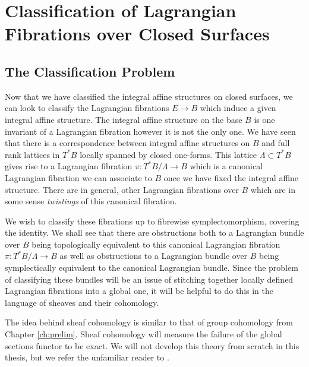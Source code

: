 \chapter{Classification of Lagrangian Fibrations over Closed Surfaces}\label{ch:classify-fibr}
\section{The Classification Problem}

Now that we have classified the integral affine structures on closed surfaces,
we can look to classify the Lagrangian fibrations $E \to B$ which induce a
given integral affine structure. The integral affine structure on the base $B$
is one invariant of a Lagrangian fibration however it is not the only one. We
have seen that there is a correspondence between integral affine structures on
$B$ and full rank lattices in $T^*B$ locally spanned by closed one-forms. This
lattice $\Lambda \subset T^*B$ gives rise to a Lagrangian fibration $\pi :
    T^*B/\Lambda \to B$ which is a canonical Lagrangian fibration we can associate
to $B$ once we have fixed the integral affine structure. There are in general,
other Lagrangian fibrations over $B$ which are in some sense \emph{twistings}
of this canonical fibration.

We wish to classify these fibrations up to fibrewise symplectomorphism,
covering the identity. We shall see that there are obstructions both to a
Lagrangian bundle over $B$ being topologically equivalent to this canonical
Lagrangian fibration $\pi : T^*B/\Lambda \to B$ as well as obstructions to a
Lagrangian bundle over $B$ being symplectically equivalent to the canonical
Lagrangian bundle. Since the problem of classifying these bundles will be an
issue of stitching together locally defined Lagrangian fibrations into a global
one, it will be helpful to do this in the language of sheaves and their
cohomology.

The idea behind sheaf cohomology is similar to that of group cohomology from
Chapter \ref{ch:prelim}. Sheaf cohomology will measure the failure of the
global sections functor to be exact. We will not develop this theory from
scratch in this thesis, but we refer the unfamiliar reader to
\cite{bredon1997sheaf}.

